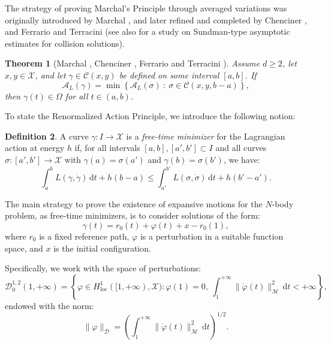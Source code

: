 \documentclass[a4paper,10pt]{amsart}
\theoremstyle{plain}
\newtheorem{thm}{Theorem}
\theoremstyle{definition}
\newtheorem{defn}[thm]{Definition}
\numberwithin{equation}{section}
\numberwithin{thm}{section}
\begin{document}
The strategy of proving Marchal's Principle through averaged variations was originally introduced by Marchal \cite{Marchal_MethodOfMinimization}, and later refined and completed by Chenciner \cite{Chenciner}, and Ferrario and Terracini \cite{FerrarioTerracini} (see also \cite{BarutelloFerrarioTerracini2008} for a study on Sundman-type asymptotic estimates for collision solutions).

\begin{thm}[Marchal \cite{Marchal_MethodOfMinimization}, Chenciner \cite{Chenciner}, Ferrario and Terracini \cite{FerrarioTerracini}]\label{thm_marchal}
Assume $d\geq 2$, let $x, y \in \mathcal{X}$, and let $\gamma \in \mathcal{C}(x, y)$ be defined on some interval $[a, b]$. If
\[
    \mathcal{A}_L(\gamma) = \min \left\{ \mathcal{A}_L(\sigma)\ :\ \sigma \in \mathcal{C}(x, y, b-a) \right\},
\]
then $\gamma(t) \in \Omega$ for all $t \in (a, b)$.
\end{thm}

To state the Renormalized Action Principle, we introduce the following notion:

\begin{defn}\label{def:free-time_minimizers}
A curve $\gamma: I \to \mathcal{X}$ is a \emph{free-time minimizer} for the Lagrangian action at energy $h$ if, for all intervals $[a, b], [a', b'] \subset I$ and all curves $\sigma: [a', b'] \to \mathcal{X}$ with $\gamma(a) = \sigma(a')$ and $\gamma(b) = \sigma(b')$, we have:
\[
    \int_a^b L(\gamma, \dot{\gamma})\, \mathrm{d}t + h(b - a) \leq \int_{a'}^{b'} L(\sigma, \dot{\sigma})\, \mathrm{d}t + h(b' - a').
\]
\end{defn}

The main strategy to prove the existence of expansive motions for the $N$-body problem, as free-time minimizers, is to consider solutions of the form:
\[
    \gamma(t) = r_0(t) + \varphi(t) + x - r_0(1),
\]
where $r_0$ is a fixed reference path, $\varphi$ is a perturbation in a suitable function space, and $x$ is the initial configuration. 

Specifically, we work with the space of perturbations:
\begin{displaymath}\label{eq:space}
    \mathcal{D}_0^{1,2}(1,+\infty) = \left\{ \varphi \in H^1_{\mathrm{loc}}([1, +\infty), \mathcal{X}) : \varphi(1) = 0,\ \int_1^{+\infty} \|\dot{\varphi}(t)\|_\mathcal{M}^2\, \mathrm{d}t < +\infty \right\},
\end{displaymath}
endowed with the norm:
\[
    \|\varphi\|_{\mathcal{D}} = \left( \int_1^{+\infty} \|\dot{\varphi}(t)\|_\mathcal{M}^2\, \mathrm{d}t \right)^{1/2}.
\]
\end{document}
